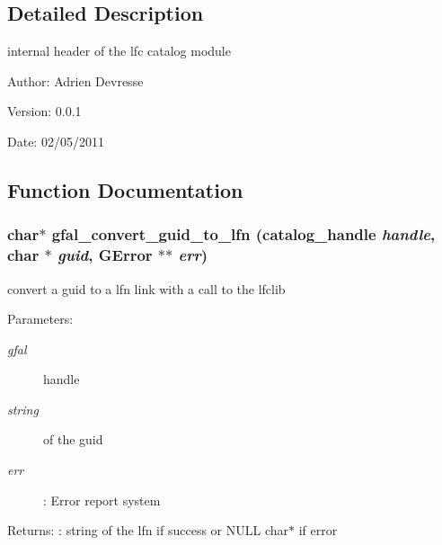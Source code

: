 \subsection{Detailed Description}
internal header of the lfc catalog module 

\begin{Desc}
\item[Author:]Adrien Devresse \end{Desc}
\begin{Desc}
\item[Version:]0.0.1 \end{Desc}
\begin{Desc}
\item[Date:]02/05/2011 \end{Desc}


\subsection{Function Documentation}
\subsubsection{\setlength{\rightskip}{0pt plus 5cm}char$\ast$ gfal\_\-convert\_\-guid\_\-to\_\-lfn (catalog\_\-handle {\em handle}, char $\ast$ {\em guid}, GError $\ast$$\ast$ {\em err})}\label{lfc__ifce__ng_8h_c4daecd5aa0938a99eb86c367a0050f1}


convert a guid to a lfn link with a call to the lfclib \begin{Desc}
\item[Parameters:]
\begin{description}
\item[{\em gfal}]handle \item[{\em string}]of the guid \item[{\em err}]: Error report system \end{description}
\end{Desc}
\begin{Desc}
\item[Returns:]: string of the lfn if success or NULL char$\ast$ if error \end{Desc}
